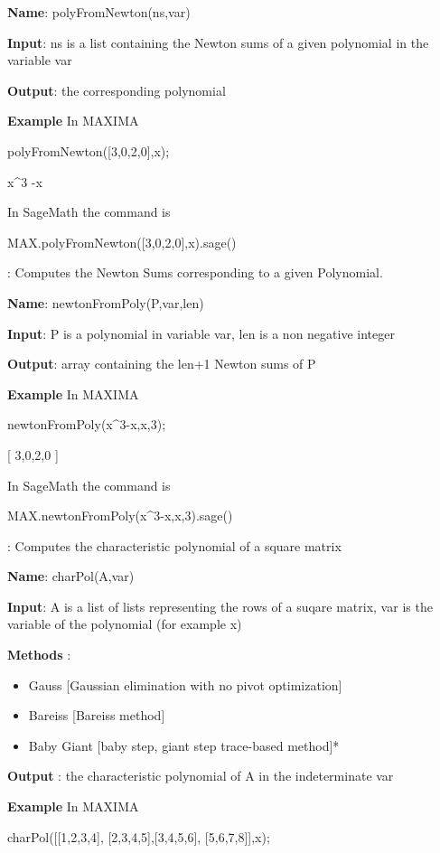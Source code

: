 \documentclass{article}
\begin{document}
{\bf Name}: polyFromNewton(ns,var)
  
{\bf Input}: ns is a list containing the Newton sums of a given polynomial in
 the variable var
  
 {\bf Output}: the corresponding polynomial
  
{\bf Example} In MAXIMA

polyFromNewton([3,0,2,0],x);

x\^{}3 -x

\noindent In SageMath the command is

MAX.polyFromNewton([3,0,2,0],x).sage()

  
:
  Computes the Newton Sums corresponding to a given Polynomial.
  
 {\bf Name}: newtonFromPoly(P,var,len)
  
 {\bf  Input}: P is a polynomial in variable var, len is a non negative integer
  
 {\bf Output}: array containing the len+1 Newton sums of P
  
 {\bf Example} In MAXIMA

newtonFromPoly(x\^{}3-x,x,3);

 [ 3,0,2,0 ]

\noindent In SageMath the command is

MAX.newtonFromPoly(x\^{}3-x,x,3).sage()

  
:
  Computes the characteristic polynomial of a square matrix
  
{\bf Name}: charPol(A,var)
  
{\bf  Input}: A is a list of lists representing the rows of a suqare matrix, var is the variable of the polynomial (for example x)
  
{\bf  Methods} :
  \begin{itemize}
    \item Gauss [Gaussian elimination with no pivot optimization]
    \item {\color{grey} Bareiss [Bareiss method]}
    \item Baby Giant [baby step, giant step trace-based method]*
  \end{itemize}
  
{\bf Output} : the characteristic polynomial of A in the indeterminate var
  
{\bf Example} In MAXIMA
  
charPol([[1,2,3,4], [2,3,4,5],[3,4,5,6], [5,6,7,8]],x);
\end{document}
